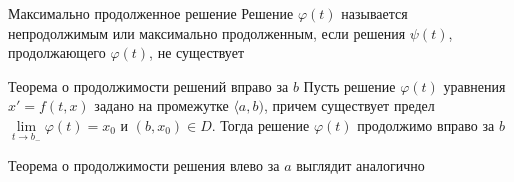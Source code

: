 \documentclass[12pt]{article}
\begin{document}
\begin{defin}{Максимально продолженное решение}
    Решение $\varphi(t)$ называется непродолжимым или максимально продолженным, если решения $\psi(t)$, продолжающего $\varphi(t)$, не существует
\end{defin}

\begin{theo}{Теорема о продолжимости решений вправо за $b$}
    Пусть решение $\varphi(t)$ уравнения $x' = f(t, x)$ задано на промежутке $\langle a, b)$, причем существует предел $\lim\limits_{t \to b_-} \varphi(t) = x_0$ и $(b, x_0) \in D$. Тогда решение $\varphi(t)$ продолжимо вправо за $b$

    Теорема о продолжимости решения влево за $a$ выглядит аналогично
\end{theo}
\end{document}
